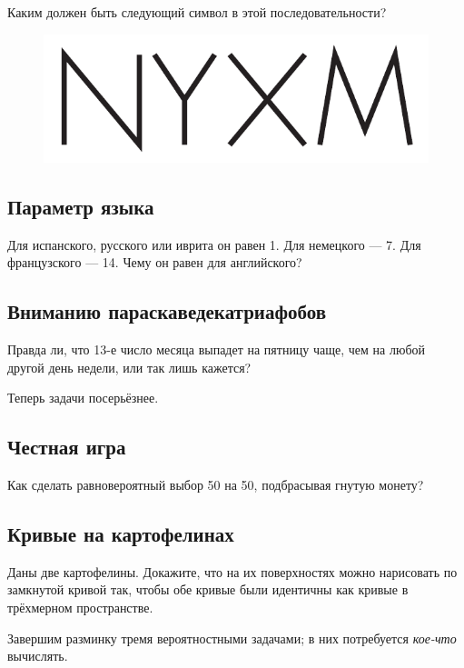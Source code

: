 Каким должен быть следующий символ в этой последовательности?

\begin{figure}[h!]
\centering
\includegraphics[scale=0.5]{pics/ZYXW}
\end{figure}

\subsection*{Параметр языка}

Для испанского, русского или иврита он равен 1.
Для немецкого --- 7.
Для французского --- 14.
Чему он равен для английского?

\subsection*{Вниманию параскаведекатриафобов}

Правда ли, что 13-е число месяца выпадет на пятницу чаще,
чем на любой другой день недели,
или так лишь кажется?

\medskip

Теперь задачи посерьёзнее.

\subsection*{Честная игра}

Как сделать равновероятный выбор 50 на 50, подбрасывая гнутую монету?

\subsection*{Кривые на картофелинах}\label{Кривые на картофелинах}

Даны две картофелины.
Докажите, что на их поверхностях можно нарисовать по замкнутой кривой так, чтобы обе кривые были идентичны как кривые в трёхмерном пространстве.

\medskip

Завершим разминку тремя вероятностными задачами; в них потребуется \emph{кое-что} вычислять.

